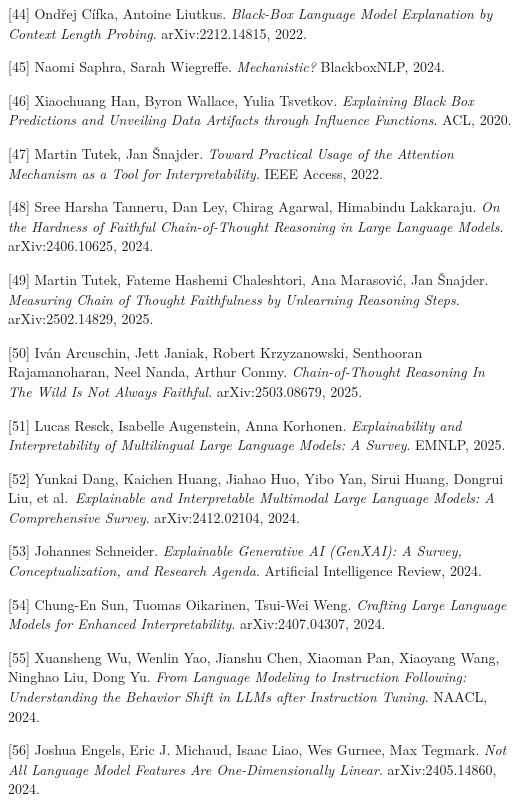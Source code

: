{[}44{]} Ondřej Cífka, Antoine Liutkus. \emph{Black-Box Language Model Explanation by Context Length Probing}. arXiv:2212.14815, 2022.

{[}45{]} Naomi Saphra, Sarah Wiegreffe. \emph{Mechanistic?} BlackboxNLP, 2024.

{[}46{]} Xiaochuang Han, Byron Wallace, Yulia Tsvetkov. \emph{Explaining Black Box Predictions and Unveiling Data Artifacts through Influence Functions}. ACL, 2020.

{[}47{]} Martin Tutek, Jan Šnajder. \emph{Toward Practical Usage of the Attention Mechanism as a Tool for Interpretability}. IEEE Access, 2022.

{[}48{]} Sree Harsha Tanneru, Dan Ley, Chirag Agarwal, Himabindu Lakkaraju. \emph{On the Hardness of Faithful Chain-of-Thought Reasoning in Large Language Models}. arXiv:2406.10625, 2024.

{[}49{]} Martin Tutek, Fateme Hashemi Chaleshtori, Ana Marasović, Jan Šnajder. \emph{Measuring Chain of Thought Faithfulness by Unlearning Reasoning Steps}. arXiv:2502.14829, 2025.

{[}50{]} Iván Arcuschin, Jett Janiak, Robert Krzyzanowski, Senthooran Rajamanoharan, Neel Nanda, Arthur Conmy. \emph{Chain-of-Thought Reasoning In The Wild Is Not Always Faithful}. arXiv:2503.08679, 2025.

{[}51{]} Lucas Resck, Isabelle Augenstein, Anna Korhonen. \emph{Explainability and Interpretability of Multilingual Large Language Models: A Survey}. EMNLP, 2025.

{[}52{]} Yunkai Dang, Kaichen Huang, Jiahao Huo, Yibo Yan, Sirui Huang, Dongrui Liu, et al.~\emph{Explainable and Interpretable Multimodal Large Language Models: A Comprehensive Survey}. arXiv:2412.02104, 2024.

{[}53{]} Johannes Schneider. \emph{Explainable Generative AI (GenXAI): A Survey, Conceptualization, and Research Agenda}. Artificial Intelligence Review, 2024.

{[}54{]} Chung-En Sun, Tuomas Oikarinen, Tsui-Wei Weng. \emph{Crafting Large Language Models for Enhanced Interpretability}. arXiv:2407.04307, 2024.

{[}55{]} Xuansheng Wu, Wenlin Yao, Jianshu Chen, Xiaoman Pan, Xiaoyang Wang, Ninghao Liu, Dong Yu. \emph{From Language Modeling to Instruction Following: Understanding the Behavior Shift in LLMs after Instruction Tuning}. NAACL, 2024.

{[}56{]} Joshua Engels, Eric J. Michaud, Isaac Liao, Wes Gurnee, Max Tegmark. \emph{Not All Language Model Features Are One-Dimensionally Linear}. arXiv:2405.14860, 2024.

